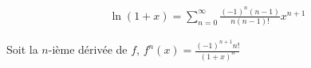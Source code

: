\documentclass{report}
\begin{document}
\begin{multicols*}{2}
      \begin{align*}
          \ln(1 + x) = \sum_{n=0}^{\infty }\frac{(-1)^n(n-1)}{n(n-1)!} 
                      x^{n + 1}
      \end{align*}      

      Soit la $n$-ième dérivée de $f$, 
      $f^{n}(x) = \frac{(-1)^{n+1}n!}{(1 + x)^n}$





















  








 









\end{multicols*}
\end{document}
